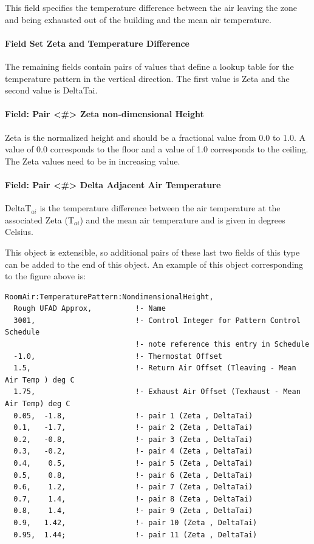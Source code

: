 This field specifies the temperature difference between the air leaving the zone and being exhausted out of the building and the mean air temperature.

\paragraph{Field Set Zeta and Temperature Difference}\label{field-set-zeta-and-temperature-difference}

The remaining fields contain pairs of values that define a lookup table for the temperature pattern in the vertical direction. The first value is Zeta and the second value is DeltaTai.

\paragraph{Field: Pair \textless{}\#\textgreater{} Zeta non-dimensional Height}\label{field-pair-zeta-non-dimensional-height}

Zeta is the normalized height and should be a fractional value from 0.0 to 1.0. A value of 0.0 corresponds to the floor and a value of 1.0 corresponds to the ceiling. The Zeta values need to be in increasing value.

\paragraph{Field: Pair \textless{}\#\textgreater{} Delta Adjacent Air Temperature}\label{field-pair-delta-adjacent-air-temperature}

DeltaT\(_{ai}\) is the temperature difference between the air temperature at the associated Zeta (T\(_{ai}\)) and the mean air temperature and is given in degrees Celsius.

This object is extensible, so additional pairs of these last two fields of this type can be added to the end of this object. An example of this object corresponding to the figure above is:

\begin{lstlisting}
RoomAir:TemperaturePattern:NondimensionalHeight,
  Rough UFAD Approx,          !- Name
  3001,                       !- Control Integer for Pattern Control Schedule
                              !- note reference this entry in Schedule
  -1.0,                       !- Thermostat Offset
  1.5,                        !- Return Air Offset (Tleaving - Mean Air Temp ) deg C
  1.75,                       !- Exhaust Air Offset (Texhaust - Mean Air Temp) deg C
  0.05,  -1.8,                !- pair 1 (Zeta , DeltaTai)
  0.1,   -1.7,                !- pair 2 (Zeta , DeltaTai)
  0.2,   -0.8,                !- pair 3 (Zeta , DeltaTai)
  0.3,   -0.2,                !- pair 4 (Zeta , DeltaTai)
  0.4,    0.5,                !- pair 5 (Zeta , DeltaTai)
  0.5,    0.8,                !- pair 6 (Zeta , DeltaTai)
  0.6,    1.2,                !- pair 7 (Zeta , DeltaTai)
  0.7,    1.4,                !- pair 8 (Zeta , DeltaTai)
  0.8,    1.4,                !- pair 9 (Zeta , DeltaTai)
  0.9,   1.42,                !- pair 10 (Zeta , DeltaTai)
  0.95,  1.44;                !- pair 11 (Zeta , DeltaTai)
\end{lstlisting}

